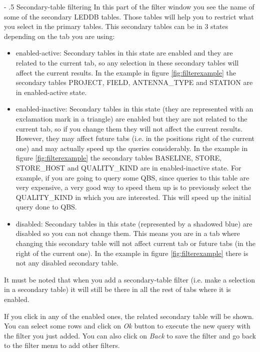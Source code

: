 \documentclass[a4paper,11pt]{article}
\makeatletter
\renewcommand\paragraph{%
   \@startsection{paragraph}{4}{0mm}%
      {-\baselineskip}%
      {.5\baselineskip}%
      {\normalfont\normalsize\bfseries}}
\makeatother
\begin{document}
\paragraph{Secondary-table filtering} 
In this part of the filter window you see the name of some of the secondary LEDDB tables. Those tables will help you to restrict what you select in the primary tables. This secondary tables can be in 3 states depending on the tab you are using:
\begin{itemize}
	\item enabled-active: Secondary tables in this state are enabled and they are related to the current tab, so any selection in these secondary tables will affect the current results. In the example in figure \ref{fig:filterexample} the secondary tables PROJECT, FIELD, ANTENNA\_TYPE and STATION are in enabled-active state.

	\item enabled-inactive: Secondary tables in this state (they are represented with an exclamation mark in a triangle) are enabled but they are not related to the current tab, so if you change them they will not affect the current results. However, they may affect future tabs (i.e. in the positions right of the current one) and may actually speed up the queries considerably. In the example in figure \ref{fig:filterexample} the secondary tables BASELINE, STORE, STORE\_HOST and QUALITY\_KIND are in enabled-inactive state. For example, if you are going to query some QBS, since queries to this table are very expensive, a very good way to speed them up is to previously select the QUALITY\_KIND in which you are interested. This will speed up the initial query done to QBS.

	\item disabled: Secondary tables in this state (represented by a shadowed blue) are disabled so you can not change them. This means you are in a tab where changing this secondary table will not affect current tab or future tabs (in the right of the current one). In the example in figure \ref{fig:filterexample} there is not any disabled secondary table.
\end{itemize}

It must be noted that when you add a secondary-table filter (i.e. make a selection in a secondary table) it will still be there in all the rest of tabs where it is enabled. 

If you click in any of the enabled ones, the related secondary table will be shown. You can select some rows and click on \textit{Ok} button to execute the new query with the filter you just added. You can also click on \textit{Back} to save the filter and go back to the filter menu to add other filters. 
\end{document}
